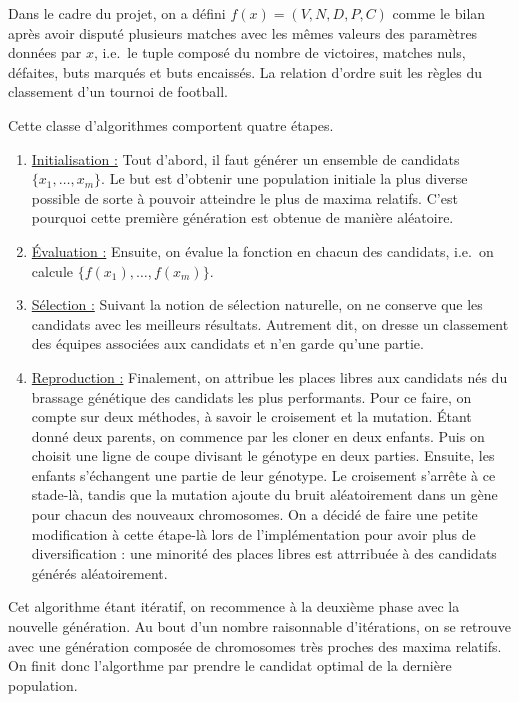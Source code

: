 \documentclass[12pt,a4paper]{article}
\begin{document}
Dans le cadre du projet, on a d\'efini $f(x)=(V,N,D,P,C)$ comme le 
bilan apr\`es avoir disput\'e plusieurs matches avec les m\^emes valeurs des 
param\`etres donn\'ees par $x$, i.e.\ le tuple compos\'e du 
nombre de 
victoires, matches nuls, d\'efaites, buts marqu\'es et buts encaiss\'es. La 
relation d'ordre suit les r\`egles du classement d'un tournoi de football.

Cette classe d'algorithmes comportent quatre \'etapes.

\begin{enumerate}
\item \underline{Initialisation :} Tout d'abord, il faut g\'en\'erer un 
ensemble de candidats $\{x_1,\dotsc,x_m\}$. Le but est d'obtenir une population 
initiale la plus diverse possible de sorte \`a pouvoir atteindre le plus de 
maxima relatifs. C'est pourquoi cette premi\`ere g\'en\'eration est obtenue de 
mani\`ere al\'eatoire.
\item \underline{\'Evaluation :} Ensuite, on \'evalue la fonction en 
chacun des candidats, i.e.\ on calcule $\{f(x_1),\dotsc,f(x_m)\}$.
\item \underline{S\'election :} Suivant la notion de s\'election 
naturelle, on ne conserve que les candidats avec les meilleurs r\'esultats. 
Autrement dit, on dresse un classement des \'equipes associ\'ees aux candidats 
et n'en garde qu'une partie.
\item \underline{Reproduction :} Finalement, on attribue les places 
libres aux candidats n\'es du brassage g\'en\'etique des candidats les 
plus performants. Pour ce faire, on compte sur deux m\'ethodes, \`a savoir le 
croisement et la mutation. \'Etant donn\'e deux parents, on commence par les 
cloner en deux enfants. Puis on choisit une ligne de coupe divisant le 
g\'enotype en deux parties. Ensuite, les enfants s'\'echangent une partie de 
leur g\'enotype. Le croisement s'arr\^ete \`a ce stade-l\`a, tandis que la 
mutation ajoute du bruit al\'eatoirement dans un g\`ene pour chacun 
des nouveaux chromosomes. On a d\'ecid\'e de faire une petite modification \`a 
cette \'etape-l\`a lors de l'impl\'ementation pour avoir plus de 
diversification : une minorit\'e des places libres est attrribu\'ee \`a des 
candidats g\'en\'er\'es al\'eatoirement.
\end{enumerate}

Cet algorithme \'etant it\'eratif, on recommence \`a la deuxi\`eme phase avec 
la nouvelle g\'en\'eration. Au bout d'un nombre raisonnable d'it\'erations, on 
se retrouve avec une g\'en\'eration compos\'ee de chromosomes tr\`es 
proches des maxima relatifs. On finit donc l'algorthme par prendre le candidat 
optimal de la derni\`ere population.  
\end{document}
